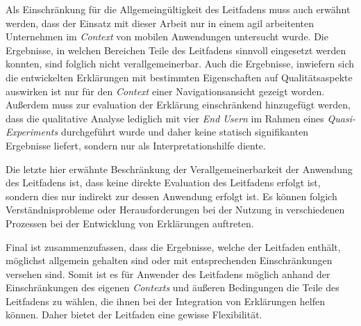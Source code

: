 Als Einschränkung für die Allgemeingültigkeit des Leitfadens muss auch erwähnt werden, dass der Einsatz mit dieser Arbeit nur in einem agil arbeitenten Unternehmen im \textit{Context} von mobilen Anwendungen untersucht wurde. Die Ergebnisse, in welchen Bereichen Teile des Leitfadens sinnvoll eingesetzt werden konnten, sind folglich nicht verallgemeinerbar. Auch die Ergebnisse, inwiefern sich die entwickelten Erklärungen mit bestimmten Eigenschaften auf Qualitätsaspekte auswirken ist nur für den \textit{Context} einer Navigationsansicht gezeigt worden. Außerdem muss zur evaluation der Erklärung einschränkend hinzugefügt werden, dass die qualitative Analyse lediglich mit vier \textit{End Usern} im Rahmen eines \textit{Quasi-Experiments} durchgeführt wurde und daher keine statisch signifikanten Ergebnisse liefert, sondern nur als Interpretationshilfe diente.

Die letzte hier erwähnte Beschränkung der Verallgemeinerbarkeit der Anwendung des Leitfadens ist, dass keine direkte Evaluation des Leitfadens erfolgt ist, sondern dies nur indirekt zur dessen Anwendung erfolgt ist. Es können folgich Verständnisprobleme oder Herausforderungen bei der Nutzung in verschiedenen Prozessen bei der Entwicklung von Erklärungen auftreten.

Final ist zusammenzufassen, dass die Ergebnisse, welche der Leitfaden enthält, möglichst allgemein gehalten sind oder mit entsprechenden Einschränkungen versehen sind. Somit ist es für Anwender des Leitfadens möglich anhand der Einschränkungen des eigenen \textit{Contexts} und äußeren Bedingungen die Teile des Leitfadens zu wählen, die ihnen bei der Integration von Erklärungen helfen können. Daher bietet der Leitfaden eine gewisse Flexibilität.